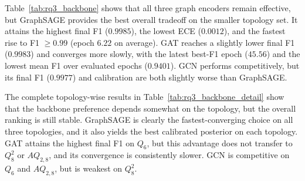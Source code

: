 \begin{table}[t]
\centering
\caption{Complete topology-wise results for the backbone comparison study.}
\label{tab:rq3_backbone_detail}
\vspace{1mm}
\end{table}

Table~\ref{tab:rq3_backbone} shows that all three graph encoders remain effective, but GraphSAGE provides the best overall tradeoff on the smaller topology set. It attains the highest final F1 ($0.9985$), the lowest ECE ($0.0012$), and the fastest rise to F1 $\geq 0.99$ (epoch $6.22$ on average). GAT reaches a slightly lower final F1 ($0.9983$) and converges more slowly, with the latest best-F1 epoch ($45.56$) and the lowest mean F1 over evaluated epochs ($0.9401$). GCN performs competitively, but its final F1 ($0.9977$) and calibration are both slightly worse than GraphSAGE.

The complete topology-wise results in Table~\ref{tab:rq3_backbone_detail} show that the backbone preference depends somewhat on the topology, but the overall ranking is still stable. GraphSAGE is clearly the fastest-converging choice on all three topologies, and it also yields the best calibrated posterior on each topology. GAT attains the highest final F1 on $Q_6$, but this advantage does not transfer to $Q_8^2$ or $AQ_{2,8}$, and its convergence is consistently slower. GCN is competitive on $Q_6$ and $AQ_{2,8}$, but is weakest on $Q_8^2$.

